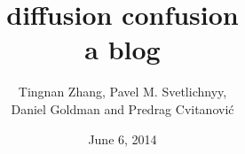\documentclass[10pt,openany]{book}
\begin{document}
        \date{June 6, 2014} \Private{\date{\today}}

\title{ 			diffusion confusion
       \\ \Huge 	a blog
        \\\vspace{1.0cm}
        }\author{
		Tingnan Zhang,
        Pavel M. Svetlichnyy,
		\\
        Daniel Goldman
         and
        Predrag Cvitanovi\'{c}
        }

%
\maketitle

\thispagestyle{empty}
\tableofcontents



\newpage




\end{document}
